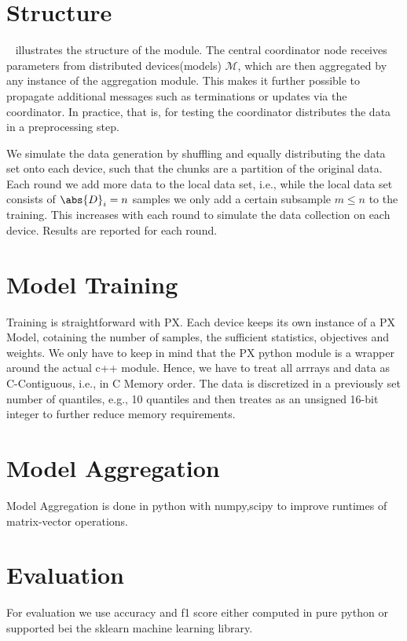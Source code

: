 \section{Structure}


\fig~ illustrates the structure of the module. 
The central coordinator node receives parameters from distributed devices(models) $\mathcal{M}$, which are then aggregated by any instance of the aggregation module. 
This makes it further possible to propagate additional messages such as terminations or updates via the coordinator.
In practice, that is, for testing the coordinator distributes the data in a preprocessing step.

We simulate the data generation by shuffling and equally distributing the data set onto each device, such that the chunks are a partition of the original data.
Each round we add more data to the local data set, i.e., while the local data set consists of $\abs{D}_i = n$ samples we only add a certain subsample $m \leq n$ to the training. This increases with each round to simulate the data collection on each device. 
Results are reported for each round.


\section{Model Training}
Training is straightforward with PX. 
Each device keeps its own instance of a PX Model, cotaining the number of samples, the sufficient statistics, objectives and weights.
We only have to keep in mind that the PX python module is a wrapper around the actual c++ module.
Hence, we have to treat all arrrays and data as C-Contiguous, i.e., in C Memory order.
The data is discretized in a previously set number of quantiles, e.g., 10 quantiles and then treates as an unsigned 16-bit integer to further reduce memory requirements.
\section{Model Aggregation}
Model Aggregation is done in python with numpy,scipy to improve runtimes of matrix-vector operations.
\section{Evaluation}
For evaluation we use accuracy and f1 score either computed in pure python or supported bei the sklearn machine learning library.